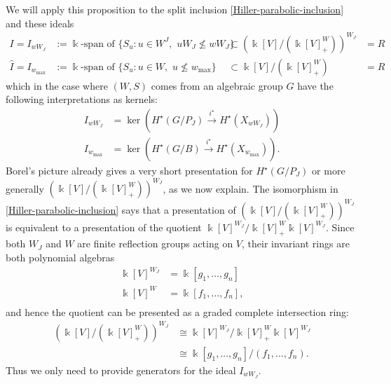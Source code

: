 \documentclass[12pt,dvips]{amsart}
\theoremstyle{plain}
\theoremstyle{definition}
\theoremstyle{remark}
\numberwithin{equation}{section}
\begin{document}
We will apply this proposition to the split inclusion \eqref{Hiller-parabolic-inclusion}
and these ideals 
\begin{equation}
\label{parabolic-ideal-definition}
\begin{array}{llll}
I=I_{wW_J} &:= \Bbbk\text{-span of }\{S_u: u \in W^J, \,\, uW_J \not\leq wW_J\} 
          &\subset  \left( \Bbbk[V] / ( \Bbbk[V]^W_+ ) \right)^{W_J}& = R\\
{\hat I} = I_{w_{\max}} &:= \Bbbk\text{-span of }\{S_u: u \in W,  \,\, u \not\leq w_{\max}\} 
                &\subset  \Bbbk[V] / ( \Bbbk[V]^W_+ ) & ={\hat R}
\end{array}
\end{equation}
which in the case where $(W,S)$ comes from an algebraic group $G$ have the following interpretations
as kernels:
\begin{equation}
\label{kernel-interpretations}
\begin{aligned}
I_{wW_J} &=\ker\left( H^\star(G/P_J) \overset{i^\star}{\rightarrow} H^\star(X_{wW_J}) \right) \\
I_{w_{\max}}&=\ker\left( H^\star(G/B) \overset{i^\star}{\rightarrow} H^\star(X_{w_{\max}}) \right).
\end{aligned}
\end{equation}
Borel's picture already gives a very short presentation for
$H^\star(G/P_J)$ or more generally $\left( \Bbbk[V] / ( \Bbbk[V]^W_+ )
\right)^{W_J}$, as we now explain.  The isomorphism in
\eqref{Hiller-parabolic-inclusion} says that a presentation of $\left(
\Bbbk[V] / ( \Bbbk[V]^W_+ ) \right)^{W_J}$ is equivalent to a
presentation of the quotient $\Bbbk[V]^{W_J}/ \Bbbk[V]^W_+
\Bbbk[V]^{W_J}$.  Since both $W_J$ and $W$ are finite reflection groups
acting on $V$, their invariant rings are both polynomial algebras
$$
\begin{aligned}
\Bbbk[V]^{W_J}&=\Bbbk[g_1,\ldots,g_n] \\
\Bbbk[V]^W &=\Bbbk[f_1,\ldots,f_n],\\
\end{aligned}
$$
and hence the quotient can be presented as a graded complete intersection ring:
$$
\begin{aligned}
\left( \Bbbk[V] / ( \Bbbk[V]^W_+ ) \right)^{W_J}
  &\cong \Bbbk[V]^{W_J}/ \Bbbk[V]^W_+ \Bbbk[V]^{W_J} \\
  &\cong \Bbbk[g_1,\ldots,g_n]/ (f_1,\ldots,f_n).
\end{aligned}
$$
Thus we only need to provide generators for the ideal $I_{wW_J}$.
\end{document}
